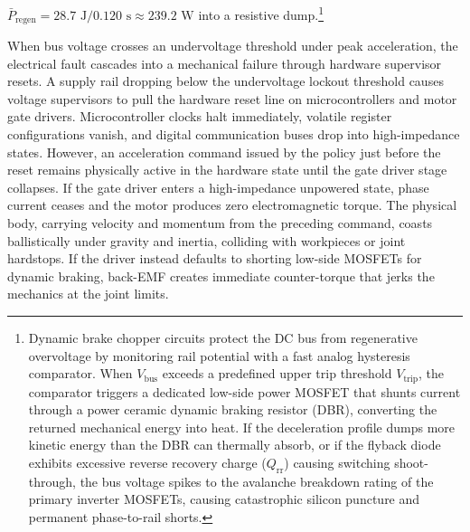 \documentclass[
  letterpaper,
  DIV=11,
  numbers=noendperiod]{scrartcl}
\begin{document}
\(\bar{P}_{\text{regen}} = 28.7\text{ J} / 0.120\text{ s} \approx 239.2\text{ W}\)
into a resistive dump.\footnote{Dynamic brake chopper circuits protect
  the DC bus from regenerative overvoltage by monitoring rail potential
  with a fast analog hysteresis comparator. When \(V_{\text{bus}}\)
  exceeds a predefined upper trip threshold \(V_{\text{trip}}\), the
  comparator triggers a dedicated low-side power MOSFET that shunts
  current through a power ceramic dynamic braking resistor (DBR),
  converting the returned mechanical energy into heat. If the
  deceleration profile dumps more kinetic energy than the DBR can
  thermally absorb, or if the flyback diode exhibits excessive reverse
  recovery charge (\(Q_{\text{rr}}\)) causing switching shoot-through,
  the bus voltage spikes to the avalanche breakdown rating of the
  primary inverter MOSFETs, causing catastrophic silicon puncture and
  permanent phase-to-rail shorts.}

When bus voltage crosses an undervoltage threshold under peak
acceleration, the electrical fault cascades into a mechanical failure
through hardware supervisor resets. A supply rail dropping below the
undervoltage lockout threshold causes voltage supervisors to pull the
hardware reset line on microcontrollers and motor gate drivers.
Microcontroller clocks halt immediately, volatile register
configurations vanish, and digital communication buses drop into
high-impedance states. However, an acceleration command issued by the
policy just before the reset remains physically active in the hardware
state until the gate driver stage collapses. If the gate driver enters a
high-impedance unpowered state, phase current ceases and the motor
produces zero electromagnetic torque. The physical body, carrying
velocity and momentum from the preceding command, coasts ballistically
under gravity and inertia, colliding with workpieces or joint hardstops.
If the driver instead defaults to shorting low-side MOSFETs for dynamic
braking, back-EMF creates immediate counter-torque that jerks the
mechanics at the joint limits.
\end{document}
